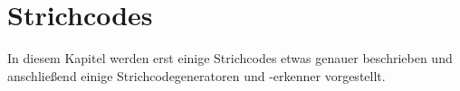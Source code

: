 \chapter{Strichcodes}
\writtenby{\dcauthornameriren}%
In diesem Kapitel werden erst einige Strichcodes etwas genauer beschrieben und anschließend einige Strichcodegeneratoren und -erkenner vorgestellt.



